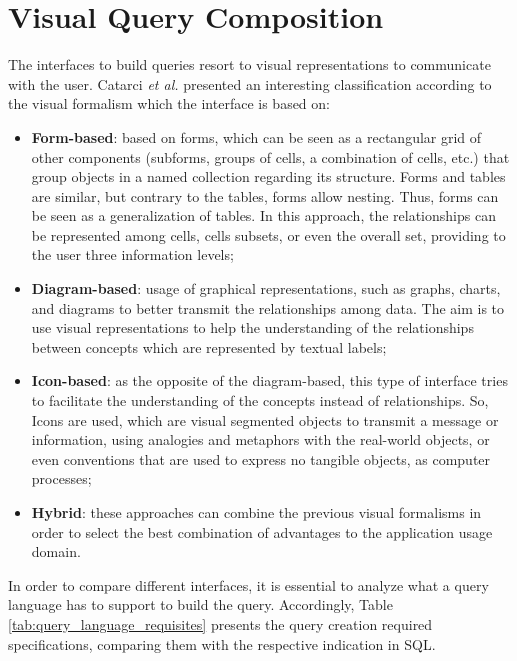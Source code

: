 \section{Visual Query Composition}
\label{sec:visual_query_composition}

The interfaces to build queries resort to visual representations to communicate with the user. Catarci \textit{et al.} \cite{visualQuerySystemsForDatabases_aSurvey} presented an interesting classification according to the visual formalism which the interface is based on:

\begin{itemize}
    \item \textbf{Form-based}: based on forms, which can be seen as a rectangular grid of other components (subforms, groups of cells, a combination of cells, etc.) that group objects in a named collection regarding its structure. Forms and tables are similar,  but contrary to the tables, forms allow nesting. Thus, forms can be seen as a generalization of tables. In this approach, the relationships can be represented among cells, cells subsets, or even the overall set, providing to the user three information levels; %
    \item \textbf{Diagram-based}: usage of graphical representations, such as graphs, charts, and diagrams to better transmit the relationships among data. The aim is to use visual representations to help the understanding of the relationships between concepts which are represented by textual labels;
    \item \textbf{Icon-based}: as the opposite of the diagram-based, this type of interface tries to facilitate the understanding of the concepts instead of relationships. So, Icons are used, which are visual segmented objects to transmit a message or information, using analogies and metaphors with the real-world objects, or even conventions that are used to express no tangible objects, as computer processes;
    \item \textbf{Hybrid}: these approaches can combine the previous visual formalisms in order to select the best combination of advantages to the application usage domain.
\end{itemize}

In order to compare different interfaces, it is essential to analyze what a query language has to support to build the query. Accordingly, Table \ref{tab:query_language_requisites} presents the query creation required specifications, comparing them with the respective indication in \gls{SQL}.

